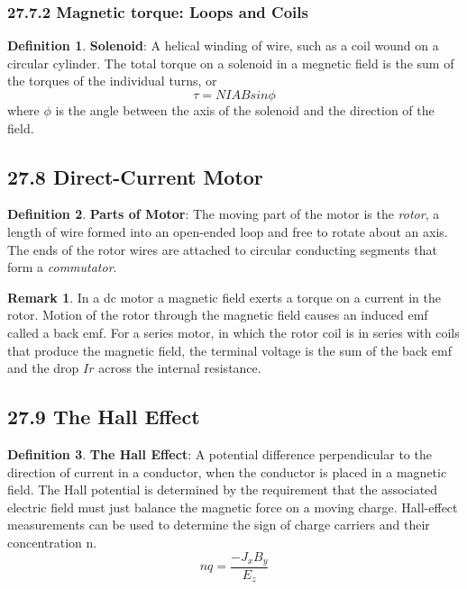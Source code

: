 \documentclass[12pt]{amsart}
\theoremstyle{definition}
\newtheorem{definition}{Definition} %
\newtheorem*{remark}{Remark}        %
\numberwithin{equation}{theorem}    %
\begin{document}
\subsubsection*{27.7.2 Magnetic torque: Loops and Coils}

\begin{definition}
    \textbf{Solenoid}:
    A helical winding of wire, such as a coil wound on a circular cylinder. The total torque on a solenoid in a megnetic field is the sum of the torques of the individual turns, or $$\tau = NIABsin\phi$$ where $\phi$ is the angle between the axis of the solenoid and the direction of the field.
\end{definition}

\subsection*{27.8 Direct-Current Motor}

\begin{definition}
    \textbf{Parts of Motor}:
    The moving part of the motor is the \textit{rotor}, a length of wire formed into an open-ended loop and free to rotate about an axis. The ends of the rotor wires are attached to circular conducting segments that form a \textit{commutator}.
\end{definition}

\begin{remark}
    In a dc motor a magnetic field exerts a torque on a current in the rotor. Motion of the rotor through the magnetic field causes an induced emf called a back emf. For a series motor, in which the rotor coil is in series with coils that produce the magnetic field, the terminal voltage is the sum of the back emf and the drop $Ir$ across the internal resistance.
\end{remark}

\subsection*{27.9 The Hall Effect}

\begin{definition}
    \textbf{The Hall Effect}:
    A potential difference perpendicular to the direction of current in a conductor, when the conductor is placed in a magnetic field. The Hall potential is determined by the requirement that the associated electric field must just balance the magnetic force on a moving charge. Hall-effect measurements can be used to determine the sign of charge carriers and their concentration n. 
    $$nq=\frac{-J_xB_y}{E_z}$$


\end{definition}
\end{document}
